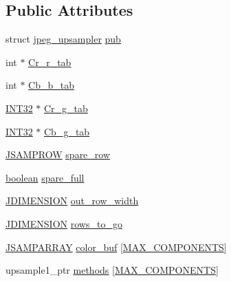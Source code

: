 \subsection*{Public Attributes}
\begin{DoxyCompactItemize}
\item 
struct \hyperlink{structjpeg__upsampler}{jpeg\+\_\+upsampler} \hyperlink{structmy__upsampler_a34dcee6f85a807bcacec127661432823}{pub}
\item 
int $\ast$ \hyperlink{structmy__upsampler_a4f008494aac28cbf152a2bf05049dfca}{Cr\+\_\+r\+\_\+tab}
\item 
int $\ast$ \hyperlink{structmy__upsampler_a0e7a2bfa2d928b6643497e092ac68205}{Cb\+\_\+b\+\_\+tab}
\item 
\hyperlink{jmorecfg_8h_a0cb58e7e6f0bad369840a52e54a56ae0}{I\+N\+T32} $\ast$ \hyperlink{structmy__upsampler_a1a14abca6bd59cb35c4e3ee51f1ed8f5}{Cr\+\_\+g\+\_\+tab}
\item 
\hyperlink{jmorecfg_8h_a0cb58e7e6f0bad369840a52e54a56ae0}{I\+N\+T32} $\ast$ \hyperlink{structmy__upsampler_af9bf33b5de13df22004b7f0f99d8195d}{Cb\+\_\+g\+\_\+tab}
\item 
\hyperlink{jpeglib_8h_ace11642f14c454c9ddbe2741132f4e68}{J\+S\+A\+M\+P\+R\+O\+W} \hyperlink{structmy__upsampler_a000b6953c558f05f68e56c2c08c12902}{spare\+\_\+row}
\item 
\hyperlink{jmorecfg_8h_a7c6368b321bd9acd0149b030bb8275ed}{boolean} \hyperlink{structmy__upsampler_a98ee90ab9a83d6d1c16c073826c34e51}{spare\+\_\+full}
\item 
\hyperlink{jmorecfg_8h_a04ed4674f6f1d0d50ec241531e38274f}{J\+D\+I\+M\+E\+N\+S\+I\+O\+N} \hyperlink{structmy__upsampler_a315364082734b3779abccc258a2954e8}{out\+\_\+row\+\_\+width}
\item 
\hyperlink{jmorecfg_8h_a04ed4674f6f1d0d50ec241531e38274f}{J\+D\+I\+M\+E\+N\+S\+I\+O\+N} \hyperlink{structmy__upsampler_a1a6b9998ad6a7501dd5287295fd8adc4}{rows\+\_\+to\+\_\+go}
\item 
\hyperlink{jpeglib_8h_ac9d5d1b829ed51769db69a37271a7e91}{J\+S\+A\+M\+P\+A\+R\+R\+A\+Y} \hyperlink{structmy__upsampler_a72da5ad87430b974aeabce55c30eb653}{color\+\_\+buf} \mbox{[}\hyperlink{jmorecfg_8h_a6d8c910a1fdb6d4762a05f7250e64322}{M\+A\+X\+\_\+\+C\+O\+M\+P\+O\+N\+E\+N\+T\+S}\mbox{]}
\item 
upsample1\+\_\+ptr \hyperlink{structmy__upsampler_a3f1f669c2871ccaee6009ec6f96899d3}{methods} \mbox{[}\hyperlink{jmorecfg_8h_a6d8c910a1fdb6d4762a05f7250e64322}{M\+A\+X\+\_\+\+C\+O\+M\+P\+O\+N\+E\+N\+T\+S}\mbox{]}
\item 

\end{DoxyCompactItemize}
